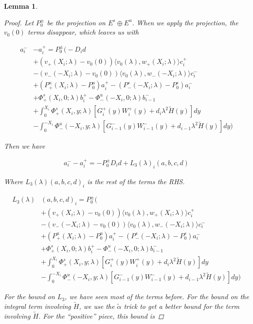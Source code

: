 \documentclass[12pt]{article}
\newtheorem{lemma}{Lemma}
\begin{document}
\begin{lemma}
\begin{proof}
Let $P_0^\pm$ be the projection on $E^s \oplus E^u$. When we apply the projection, the $v_0(0)$ terms disappear, which leaves us with

\begin{align*}
a_i^- &- a_i^+ = P_0^\pm \Big(-D_i d \\
&+(v_+(X_i; \lambda) - v_0(0)) \langle v_0(\lambda), w_+(X_i; \lambda) \rangle c_i^+ \\
&- (v_-(-X_i; \lambda) - v_0(0)) \langle v_0(\lambda), w_-(-X_i; \lambda) \rangle c_i^- \\
&+ (P^u_+(X_i; \lambda) - P_0^u)a_i^+ - (P^s_-(-X_i; \lambda) - P_0^s)a_i^- \\
&+ \Phi^s_+(X_i, 0; \lambda)b_i^+ - \Phi^u_-(-X_i, 0; \lambda)b_{i-1}^- \\
&+ \int_0^{X_i} \Phi^s_+(X_i, y; \lambda) [ G_i^+(y) W_i^+(y) + d_i \lambda^2 \tilde{H}(y) ] dy \\
&- \int_0^{-X_i} \Phi^u_-(-X_i, y; \lambda) [ G_{i-1}^-(y) W_{i-1}^-(y) + d_{i-1} \lambda^2 \tilde{H}(y) ] dy \Big)
\end{align*}

Then we have

\begin{align*}
a_i^- - a_i^+ = -P_0^\pm D_i d + L_3(\lambda)_i(a, b, c, d)
\end{align*}

Where $L_3(\lambda)(a, b, c, d)_i$ is the rest of the terms the RHS.

\begin{align*}
L_3(\lambda)&(a, b, c, d)_i = P_0^\pm \Big( \\
&+(v_+(X_i; \lambda) - v_0(0)) \langle v_0(\lambda), w_+(X_i; \lambda) \rangle c_i^+ \\
&- (v_-(-X_i; \lambda) - v_0(0)) \langle v_0(\lambda), w_-(-X_i; \lambda) \rangle c_i^- \\
&+ (P^u_+(X_i; \lambda) - P_0^u)a_i^+ - (P^s_-(-X_i; \lambda) - P_0^s)a_i^- \\
&+ \Phi^s_+(X_i, 0; \lambda)b_i^+ - \Phi^u_-(-X_i, 0; \lambda)b_{i-1}^- \\
&+ \int_0^{X_i} \Phi^s_+(X_i, y; \lambda) [ G_i^+(y) W_i^+(y) + d_i \lambda^2 \tilde{H}(y) ] dy \\
&- \int_0^{-X_i} \Phi^u_-(-X_i, y; \lambda) [ G_{i-1}^-(y) W_{i-1}^-(y) + d_{i-1} \lambda^2 \tilde{H}(y) ] dy \Big)
\end{align*}

For the bound on $L_3$, we have seen most of the terms before. For the bound on the integral term involving $\tilde{H}$, we use the $\tilde{\alpha}$ trick to get a better bound for the term involving $\tilde{H}$. For the ``positive'' piece, this bound is


\end{proof}
\end{lemma}
\end{document}
